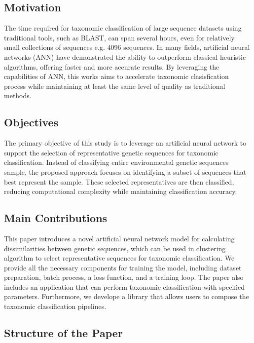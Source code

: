 \documentclass{article}
\begin{document}
        \subsection{Motivation}

            The time required for taxonomic classification of large sequence datasets using traditional tools, such as BLAST, can span several hours, even for relatively small collections of sequences e.g. 4096 sequences. In many fields, artificial neural networks (ANN) have demonstrated the ability to outperform classical heuristic algorithms, offering faster and more accurate results. By leveraging the capabilities of ANN, this works aims to accelerate taxonomic clasisfication process while maintaining at least the same level of quality as traditional methods.

        \subsection{Objectives}
    
            The primary objective of this study is to leverage an artificial neural network to support the selection of representative genetic sequences for taxonomic classification. Instead of classifying entire environmental genetic sequences sample, the proposed approach focuses on identifying a subset of sequences that best represent the sample. These selected representatives are then classified, reducing computational complexity while maintaining classification accuracy.

        \subsection{Main Contributions}

            This paper introduces a novel artificial neural network model for calculating dissimilarities between genetic sequences, which can be used in clustering algorithm to select representative sequences for taxonomic classification. We provide all the necessary components for training the model, including dataset preparation, batch process, a loss function, and a training loop. The paper also includes an application that can perform taxonomic classification with specified parameters. Furthermore, we develope a library that allows users to compose the taxonomic classification pipelines.

        \subsection{Structure of the Paper}
\end{document}
